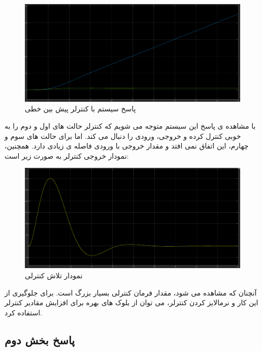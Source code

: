 \begin{figure}[H]
	\centering
	\includegraphics[width=1\linewidth]{../img/Q2_LMPC_Response}
	\caption{پاسخ سیستم با کنترلر پیش بین خطی}
	\label{fig:q2lmpcresponse}
\end{figure}
با مشاهده ی پاسخ این سیستم متوجه می شویم که کنترلر حالت های اول و دوم را به خوبی کنترل کرده و خروجی، ورودی را دنبال می کند. اما برای حالت های سوم و چهارم، این اتفاق نمی افتد و مقدار خروجی با ورودی فاصله ی زیادی دارد.
همچنین، نمودار خروجی کنترلر به صورت زیر است:
\begin{figure}[H]
	\centering
	\includegraphics[width=1\linewidth]{../img/Q2_LMPC_ِCeffort}
	\caption{نمودار تلاش کنترلی}
	\label{fig:q2lmpcceffort}
\end{figure}
آنچنان که مشاهده می شود، مقدار فرمان کنترلی بسیار بزرگ است. برای جلوگیری از این کار و نرمالایز کردن کنترلر، می توان از بلوک های بهره برای افزایش مقادیر کنترلر استفاده کرد.
\subsection*{پاسخ بخش دوم}
